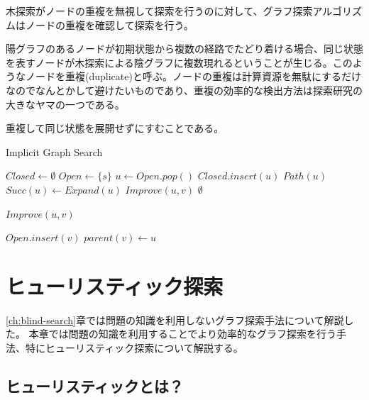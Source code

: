 \documentclass{report}
\begin{document}
木探索がノードの重複を無視して探索を行うのに対して、グラフ探索アルゴリズムはノードの重複を確認して探索を行う。

陽グラフのあるノードが初期状態から複数の経路でたどり着ける場合、同じ状態を表すノードが木探索による陰グラフに複数現れるということが生じる。このようなノードを重複(duplicate)と呼ぶ。ノードの重複は計算資源を無駄にするだけなのでなんとかして避けたいものであり、重複の効率的な検出方法は探索研究の大きなヤマの一つである。

重複して同じ状態を展開せずにすむことである。



\begin{algorithm}
\caption{Implicit Graph Search}
\label{alg:implicit-graph-search}
	$Closed \leftarrow \emptyset$\;
	$Open \leftarrow \{s\}$\;
	 {
		$u \leftarrow Open.pop()$\;
		$Closed.insert(u)$\;
		 {
			\Return $Path(u)$\;
		}
		$Succ(u) \leftarrow Expand(u)$\;
		 {
			$Improve(u, v)$\;
		}
 	}
	\Return $\emptyset$\;
\end{algorithm}

\begin{algorithm}
\caption{$Improve(u,v)$}
\label{alg:improve}
	 {
		$Open.insert(v)$\;
		$parent(v) \leftarrow u$\;
	}
\end{algorithm}


\chapter{ヒューリスティック探索}
\label{ch:heuristic-search}

\ref{ch:blind-search}章では問題の知識を利用しないグラフ探索手法について解説した。
本章では問題の知識を利用することでより効率的なグラフ探索を行う手法、特にヒューリスティック探索について解説する。

\section{ヒューリスティックとは？}
\label{sec:heursitic}
\end{document}
